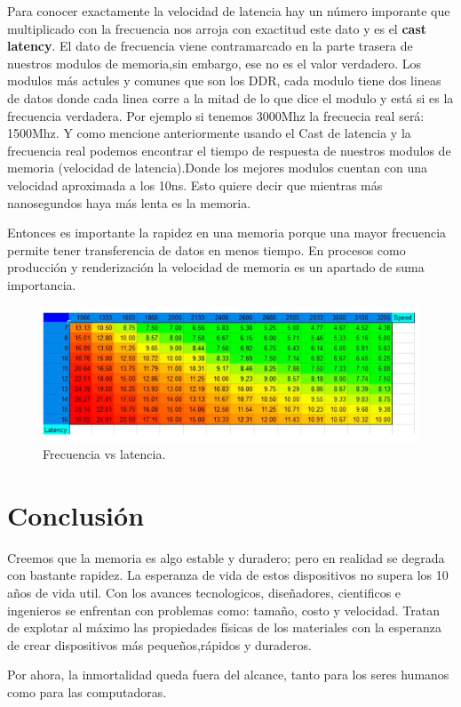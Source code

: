 \documentclass{article}
\begin{document}
Para conocer exactamente la velocidad de latencia hay un número imporante que multiplicado con la frecuencia nos  arroja con exactitud este dato y es el \textbf{cast latency}. El dato de frecuencia viene contramarcado en la parte trasera de nuestros modulos de memoria,sin embargo, ese no es el valor verdadero. Los modulos más actules y comunes que son los DDR, cada modulo tiene dos lineas de datos donde cada linea corre a la mitad de lo que dice el modulo y está si es la frecuencia verdadera. Por ejemplo si tenemos 3000Mhz la frecuecia real será: 1500Mhz. Y como mencione anteriormente usando el Cast de latencia y la frecuencia real podemos encontrar el tiempo de respuesta de nuestros modulos de memoria (velocidad de latencia).Donde los mejores modulos cuentan con una velocidad aproximada  a los 10ns. Esto quiere decir que mientras más nanosegundos haya más lenta es la memoria.
\vspace{0.2cm}

Entonces es importante la rapidez en una memoria porque una mayor frecuencia permite tener transferencia de datos en menos tiempo. En procesos como producción y renderización la velocidad de memoria es un apartado de suma importancia.

\begin{figure}[h]
\includegraphics[width=12cm]{latencia.PNG}
\centering
\caption{Frecuencia vs latencia.}
\label{latencia.PNG}
\end{figure}
\newpage
\section{Conclusión}
Creemos que la memoria es algo estable y duradero; pero en realidad se degrada con bastante rapidez. La esperanza de vida de estos dispositivos no supera los 10 años de vida util. Con los avances tecnologicos, diseñadores, cientificos e ingenieros se enfrentan con problemas como: tamaño, costo y velocidad. Tratan de explotar al máximo las propiedades físicas de los materiales con la esperanza de crear dispositivos más pequeños,rápidos y duraderos.

Por ahora, la inmortalidad queda fuera del alcance, tanto para los seres humanos como para las computadoras\cite{TEDwebsite}.



\newpage

\noindent
\end{document}
